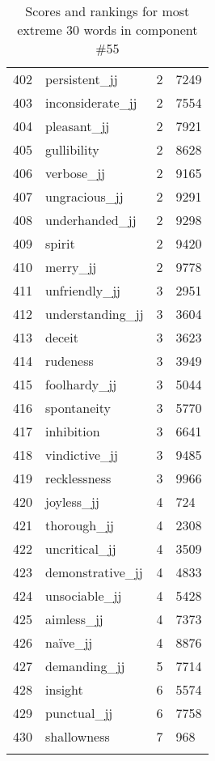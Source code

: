 \begin{longtable}[!htbp]{| rlr@{.}l |}
    402 & persistent\_jj & 2 & 7249 \\
    403 & inconsiderate\_jj & 2 & 7554 \\
    404 & pleasant\_jj & 2 & 7921 \\
    405 & gullibility & 2 & 8628 \\
    406 & verbose\_jj & 2 & 9165 \\
    407 & ungracious\_jj & 2 & 9291 \\
    408 & underhanded\_jj & 2 & 9298 \\
    409 & spirit & 2 & 9420 \\
    410 & merry\_jj & 2 & 9778 \\
    411 & unfriendly\_jj & 3 & 2951 \\
    412 & understanding\_jj & 3 & 3604 \\
    413 & deceit & 3 & 3623 \\
    414 & rudeness & 3 & 3949 \\
    415 & foolhardy\_jj & 3 & 5044 \\
    416 & spontaneity & 3 & 5770 \\
    417 & inhibition & 3 & 6641 \\
    418 & vindictive\_jj & 3 & 9485 \\
    419 & recklessness & 3 & 9966 \\
    420 & joyless\_jj & 4 & 724 \\
    421 & thorough\_jj & 4 & 2308 \\
    422 & uncritical\_jj & 4 & 3509 \\
    423 & demonstrative\_jj & 4 & 4833 \\
    424 & unsociable\_jj & 4 & 5428 \\
    425 & aimless\_jj & 4 & 7373 \\
    426 & naïve\_jj & 4 & 8876 \\
    427 & demanding\_jj & 5 & 7714 \\
    428 & insight & 6 & 5574 \\
    429 & punctual\_jj & 6 & 7758 \\
    430 & shallowness & 7 & 968 \\
    \hline
    \caption{Scores and rankings for most extreme 30 words in component \#55} \\
\end{longtable}
